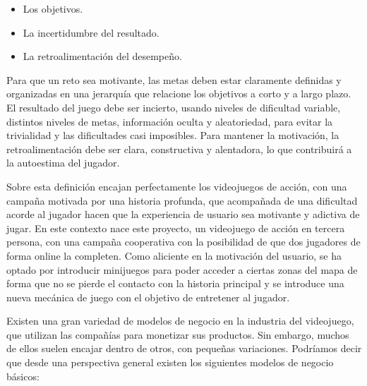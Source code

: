 \begin{itemize}
\item Los objetivos.
\item La incertidumbre del resultado.
\item La retroalimentación del desempeño.
\end{itemize}

Para que un reto sea motivante, las metas deben estar claramente definidas y organizadas en una jerarquía que relacione los objetivos a corto y a largo plazo. El resultado del juego debe ser incierto, usando niveles de dificultad variable, distintos niveles de metas, información oculta y aleatoriedad, para evitar la trivialidad y las dificultades casi imposibles. Para mantener la motivación, la retroalimentación debe ser clara, constructiva y alentadora, lo que contribuirá a la autoestima del jugador.

Sobre esta definición encajan perfectamente los videojuegos de acción, con una campaña motivada por una historia profunda, que acompañada de una dificultad acorde al jugador hacen que la experiencia de usuario sea motivante y adictiva de jugar. En este contexto nace este proyecto, un videojuego de acción en tercera persona, con una campaña cooperativa con la posibilidad de que dos jugadores de forma online la completen. Como aliciente en la motivación del usuario, se ha optado por introducir minijuegos para poder acceder a ciertas zonas del mapa de forma que no se pierde el contacto con la historia principal y se introduce una nueva mecánica de juego con el objetivo de entretener al jugador. 

Existen una gran variedad de modelos de negocio en la industria del videojuego, que utilizan las compañías para monetizar sus productos. Sin embargo, muchos de ellos suelen encajar dentro de otros, con pequeñas variaciones. Podríamos decir que desde una perspectiva general existen los siguientes modelos de negocio básicos:

